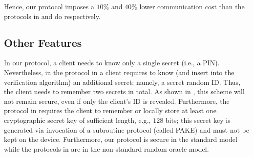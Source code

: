 Hence, our protocol imposes a $10\%$ and $40\%$ lower communication cost than the protocols in \cite{WangW18} and \cite{JareckiJKSS21} do respectively.


\subsection{Other Features}

 In our protocol, a client needs to know only a single secret (i.e., a  PIN). Nevertheless, in the protocol in \cite{WangW18} a client requires to know (and insert into the verification algorithm) an additional secret; namely, a secret random ID. Thus, the client needs to remember two secrets in total.  As shown in \cite{Scott12a}, this scheme will not remain secure, even if only the client's ID is revealed. Furthermore, the protocol in \cite{JareckiJKSS21} requires the client to remember or locally store at least one cryptographic secret key of sufficient length, e.g., $128$ bits; this secret key is generated via invocation of a subroutine protocol (called PAKE) and must not be kept on the device. 
 Furthermore, our protocol is secure in the standard model while the protocols in \cite{WangW18,JareckiJKSS21} are in the non-standard random oracle model. 

